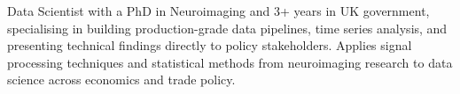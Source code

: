 
\begin{cvparagraph}
Data Scientist with a PhD in Neuroimaging and 3+ years in UK government, specialising in building production-grade data pipelines, time series analysis, and presenting technical findings directly to policy stakeholders. Applies signal processing techniques and statistical methods from neuroimaging research to data science across economics and trade policy.
\end{cvparagraph}
